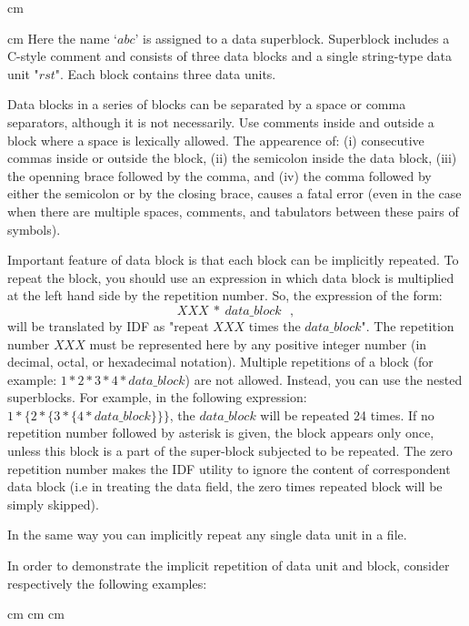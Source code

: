 \leftline{
\ \ \ \ \ \ \ \ \};
}
 cm

{
{ cm} Here the name `$abc$' 
is assigned to a data superblock.
Superblock includes a C-style comment and 
consists of three data blocks
and a single string-type data unit "$rst$".
Each block contains three data units.
}

Data blocks in a series of blocks can be separated by a space or comma
separators, although it is not necessarily. 
Use comments inside and outside a block
where a space is lexically allowed. 
The appearence of:
(i) consecutive commas inside or outside the block,
(ii) the semicolon inside the data block,
(iii) the openning brace followed by the comma,
and 
(iv) the comma followed by either the semicolon or by the closing brace,
causes a fatal error 
(even in the case when there are multiple spaces, comments, and tabulators
between these pairs of symbols).

Important feature of data block is that each block can be implicitly
repeated. To repeat the block, you should use an expression
in which data block is multiplied at the left hand side 
by the repetition number. So, the expression of the form:
$$XXX\ * \ data\_block ~~~,$$ will be translated by IDF as
"repeat $XXX$ times the $data\_block$". The repetition
number $XXX$ must be represented here by any positive integer number
(in decimal, octal, or hexadecimal notation).
Multiple repetitions of a block (for example: $1*2*3*4* data\_block$)
are not allowed.
Instead, you can use the nested superblocks.
For example, in the following expression: $1*\{2*\{3*\{4* data\_block\}\}\}$,
the $data\_block$ will be repeated 24 times.
If no repetition number followed by asterisk is given, the
block appears only once, unless this block is a part of the super-block
subjected to be repeated.
The zero repetition number makes the IDF utility
to ignore the content of correspondent data block
(i.e in treating the data field, the zero times repeated block will be
simply skipped).

In the same way you can implicitly repeat any single data unit
in a file.

In order to demonstrate 
the implicit repetition of data unit and block, consider respectively
the following examples:

 cm
 cm
 cm

